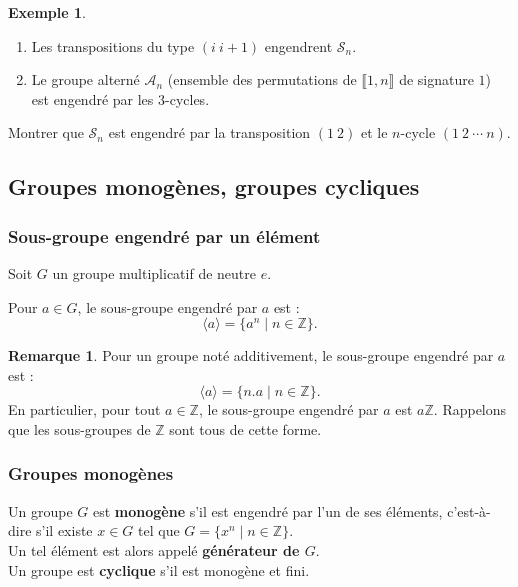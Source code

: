 \documentclass[french]{article}
\newcommand{\Z}{\mathbb{Z}}
\theoremstyle{plain}
\theoremstyle{definition}
\newtheorem*{ex}{Exemple}
\newtheorem*{rmq}{Remarque}
\theoremstyle{remark}
\begin{document}
\begin{ex}
	\begin{enumerate}
		\item Les transpositions du type $(i\ i+1)$ engendrent $\mathcal{S}_n$.
		\item Le groupe alterné $\mathcal{A}_n$ (ensemble des permutations de $\llbracket1,n\rrbracket$ de signature $1$) est engendré par les $3$-cycles.
	\end{enumerate}
\end{ex}

\begin{exo}
	Montrer que $\mathcal{S}_n$ est engendré par la transposition $(1\ 2)$ et le $n$-cycle $(1\ 2\ \cdots\ n)$.
\end{exo}

\subsection{Groupes monogènes, groupes cycliques}


\subsubsection*{Sous-groupe engendré par un élément}

Soit $G$ un groupe multiplicatif de neutre $e$.

\begin{prop}%
	Pour $a\in G$, le sous-groupe engendré par $a$ est :
	$$\langle a\rangle=\{a^n\mid n\in\Z\}.$$
\end{prop}

\begin{rmq}
	Pour un groupe noté additivement, le sous-groupe engendré par $a$ est :
	$$\langle a\rangle=\{n.a\mid n\in\Z\}.$$
	En particulier, pour tout $a\in\Z$, le sous-groupe engendré par $a$ est $a\Z$. Rappelons que les sous-groupes de $\Z$ sont tous de cette forme.
\end{rmq}

\subsubsection*{Groupes monogènes}

\begin{dfn}
	Un groupe $G$ est \textbf{monogène} s'il est engendré par l'un de ses éléments, c'est-à-dire s'il existe $x\in G$ tel que $G=\{x^n\mid n\in\Z\}$. \\
	Un tel élément est alors appelé \textbf{générateur de $G$}.\\
	Un groupe est \textbf{cyclique} s'il est monogène et fini.
\end{dfn}
\end{document}
